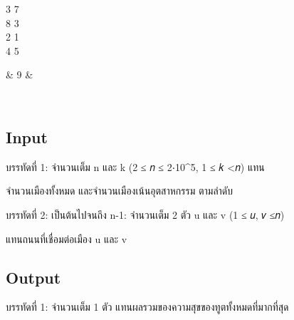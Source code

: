 \documentclass{article}
\begin{document}
{\begin{longtable}[]
\begin{minipage}[t]{\linewidth}
3 7\\

8 3\\

2 1\\

4 5\\

\strut

\end{minipage} & 9 & \begin{minipage}[t]{\linewidth}\raggedright

\hfill\break

\strut

\end{minipage} \\

\end{longtable}

}



\subsection*{Input}
บรรทัดที่ 1: จำนวนเต็ม n และ k (2 ≤ 𝑛 ≤ 2⋅10\^{}5, 1 ≤ 𝑘 \textless 𝑛) แทน

จำนวนเมืองทั้งหมด และจำนวนเมืองเน้นอุตสาหกรรม ตามลำดับ



บรรทัดที่ 2: เป็นต้นไปจนถึง n-1: จำนวนเต็ม 2 ตัว u และ v (1 ≤ 𝑢, 𝑣 ≤𝑛)

แทนถนนที่เชื่อมต่อเมือง u และ v



\subsection*{Output}
บรรทัดที่ 1: จำนวนเต็ม 1 ตัว แทนผลรวมของความสุขของทูตทั้งหมดที่มากที่สุด\\
\end{document}
